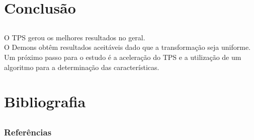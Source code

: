 \documentclass[t]{beamer}
\begin{document}
\section{Conclusão}
\subsection{}

\begin{frame}
    O TPS gerou os melhores resultados no geral. \\
    O Demons obtêm resultados aceitáveis dado que a transformação seja uniforme. \\
    Um próximo passo para o estudo é a aceleração do TPS e a utilização de um algoritmo para a determinação das características.
\end{frame}

\section{Bibliografia}
\subsection{}

\begin{frame}[allowframebreaks]
  \frametitle{Referências}    
  \framesubtitle{}
  
  {}
\end{frame}
\end{document}
